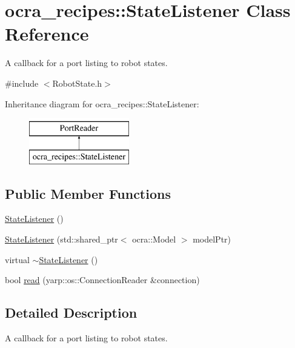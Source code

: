 \hypertarget{classocra__recipes_1_1StateListener}{}\section{ocra\+\_\+recipes\+:\+:State\+Listener Class Reference}
\label{classocra__recipes_1_1StateListener}


A callback for a port listing to robot states.  




{\ttfamily \#include $<$Robot\+State.\+h$>$}

Inheritance diagram for ocra\+\_\+recipes\+:\+:State\+Listener\+:\begin{figure}[H]
\begin{center}
\leavevmode
\includegraphics[height=2.000000cm]{d2/dde/classocra__recipes_1_1StateListener}
\end{center}
\end{figure}
\subsection*{Public Member Functions}
\begin{DoxyCompactItemize}
\item 
\hyperlink{classocra__recipes_1_1StateListener_ab2d5128398eeb9990f34a633e9a4e181}{State\+Listener} ()
\item 
\hyperlink{classocra__recipes_1_1StateListener_a6861fabf2b226ce71ba2bcfa766a4538}{State\+Listener} (std\+::shared\+\_\+ptr$<$ ocra\+::\+Model $>$ model\+Ptr)
\item 
virtual \hyperlink{classocra__recipes_1_1StateListener_a84961512f9533cc039ca2deefbabbb73}{$\sim$\+State\+Listener} ()
\item 
bool \hyperlink{classocra__recipes_1_1StateListener_a10196cebd253c4b98fb39371c95cc68a}{read} (yarp\+::os\+::\+Connection\+Reader \&connection)
\end{DoxyCompactItemize}


\subsection{Detailed Description}
A callback for a port listing to robot states. 

